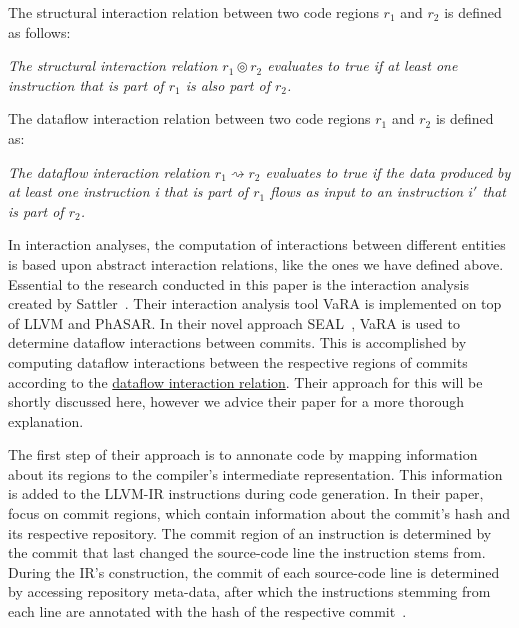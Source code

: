 The structural interaction relation between two code regions $r_1$ and $r_2$ is defined as follows:

\begin{definition}\label{def:structural_relation}
	\emph{The structural interaction relation $r_1 \circledcirc r_2$ evaluates to true if at least one instruction that is part of $r_1$
	is also part of $r_2$.}
\end{definition}

The dataflow interaction relation between two code regions $r_1$ and $r_2$ is defined as:

\begin{definition}\label{def:dataflow_relation}
	\emph{The dataflow interaction relation $r_1 \rightsquigarrow r_2$ evaluates to true if the data produced by at least one instruction i that is part of $r_1$
	flows as input to an instruction $i'$ that is part of $r_2$.}
\end{definition}

In interaction analyses, the computation of interactions between different entities is based upon abstract interaction relations, like the ones we have defined above.
Essential to the research conducted in this paper is the interaction analysis created by Sattler~\cite{sattler2023thesis}.
Their interaction analysis tool VaRA is implemented on top of LLVM and PhASAR.
In their novel approach SEAL~\cite{sattler2023seal}, VaRA is used to determine dataflow interactions between commits.
This is accomplished by computing dataflow interactions between the respective regions of commits according to the \hyperref[def:dataflow_relation]{dataflow interaction relation}.
Their approach for this will be shortly discussed here, however we advice their paper for a more thorough explanation. 

The first step of their approach is to annonate code by mapping information about its regions to the compiler's intermediate representation.
This information is added to the LLVM-IR instructions during code generation.
In their paper, \citet{sattler2023seal} focus on commit regions, which contain information about the commit's hash and its respective repository.
The commit region of an instruction is determined by the commit that last changed the source-code line the instruction stems from.
During the IR's construction, the commit of each source-code line is determined by accessing repository meta-data, after which the instructions stemming from each line are annotated with the hash of the respective commit~\cite{sattler2023seal}.

